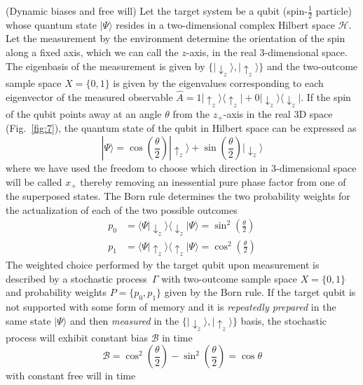 \documentclass{ws-ijmpb}
\begin{document}
\begin{example}
(Dynamic biases and free will)
Let the target system be a qubit (spin-$\frac{1}{2}$ particle) whose
quantum state $|\Psi\rangle$ resides in a two-dimensional complex
Hilbert space $\mathcal{H}$. Let the measurement by the environment
determine the orientation of the spin along a fixed axis, which we
can call the $z$-axis, in the real 3-dimensional space. The eigenbasis
of the measurement is given by $\{|\downarrow_{z}\rangle,|\uparrow_{z}\rangle\}$
and the two-outcome sample space $X=\{0,1\}$ is given by the eigenvalues
corresponding to each eigenvector of the measured observable
$\hat{A}= 1 |\uparrow_{z}\rangle\langle\uparrow_{z}| + 0 |\downarrow_{z}\rangle\langle\downarrow_{z}|$.
If the spin of the qubit points away at an angle $\theta$ from the
$z_{+}$-axis in the real 3D space (Fig.~\ref{fig:7}), the quantum
state of the qubit in Hilbert space can be expressed as
\begin{equation}
|\Psi\rangle=\cos\left(\frac{\theta}{2}\right)|\uparrow_{z}\rangle+\sin\left(\frac{\theta}{2}\right)|\downarrow_{z}\rangle
\end{equation}
where we have used the freedom to choose which direction in 3-dimensional space will be called $x_+$ thereby removing an inessential pure phase factor from one of the superposed states. The Born rule determines the two probability weights for the actualization
of each of the two possible outcomes 
\begin{align}
p_{0} & =\langle\Psi|\downarrow_{z}\rangle\langle\downarrow_{z}|\Psi\rangle=\sin^{2}\left(\frac{\theta}{2}\right)\\
p_{1} & =\langle\Psi|\uparrow_{z}\rangle\langle\uparrow_{z}|\Psi\rangle=\cos^{2}\left(\frac{\theta}{2}\right)
\end{align}
The weighted choice performed by the target qubit upon measurement
is described by a stochastic process~$\Gamma$ with two-outcome sample
space $X=\{0,1\}$ and probability weights $P=\{p_{0},p_{1}\}$ given
by the Born rule. If the target qubit is not supported with some form
of memory and it is \emph{repeatedly prepared} in the same state $|\Psi\rangle$
and then \emph{measured} \cite{Gudder2022,Busch1990} in the $\{|\downarrow_{z}\rangle,|\uparrow_{z}\rangle\}$
basis, the stochastic process will exhibit constant bias $\mathscr{B}$
in time
\begin{equation}
\mathscr{B}=\cos^{2}\left(\frac{\theta}{2}\right)-\sin^{2}\left(\frac{\theta}{2}\right)=\cos\theta
\end{equation}
with constant free will in time

\end{example}
\end{document}
